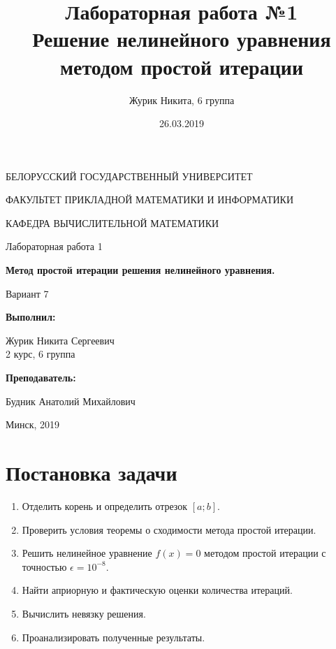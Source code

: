 \documentclass[14pt, a4paper]{article}
\title {Лабораторная работа №1 \\ Решение нелинейного уравнения методом простой итерации}
\author {Журик Никита, 6 группа}
\date {26.03.2019}
\begin{document}
\begin{titlepage}
\begin{center}
\large{БЕЛОРУССКИЙ ГОСУДАРСТВЕННЫЙ УНИВЕРСИТЕТ 

ФАКУЛЬТЕТ ПРИКЛАДНОЙ МАТЕМАТИКИ И ИНФОРМАТИКИ

КАФЕДРА ВЫЧИСЛИТЕЛЬНОЙ МАТЕМАТИКИ}
\end{center}
\vspace*{\fill}
\begin{center}
Лабораторная работа 1

\large{\textbf{Метод простой итерации решения нелинейного уравнения.}}

Вариант 7
\end{center}
\begin{flushright}
\textbf{Выполнил:}

Журик Никита Сергеевич \\ 2 курс, 6 группа

\textbf{Преподаватель:}

Будник Анатолий Михайлович
\end{flushright}
\vspace*{\fill}
\begin{center}
Минск, 2019
\end{center}
\end{titlepage}

\tableofcontents
\newpage

\newpage
{}

  \section{Постановка задачи}
    \begin{enumerate}
      \item
      Отделить корень и определить отрезок $[a; b]$.
      \item
      Проверить условия теоремы о сходимости метода простой итерации.
      \item
      Решить нелинейное уравнение $f(x) = 0$ методом простой итерации с точностью $\epsilon = 10^{-8}$.
      \item
      Найти априорную и фактическую оценки количества итераций.
      \item
      Вычислить невязку решения.
      \item
      Проанализировать полученные результаты.
    \end{enumerate}
\end{document}
